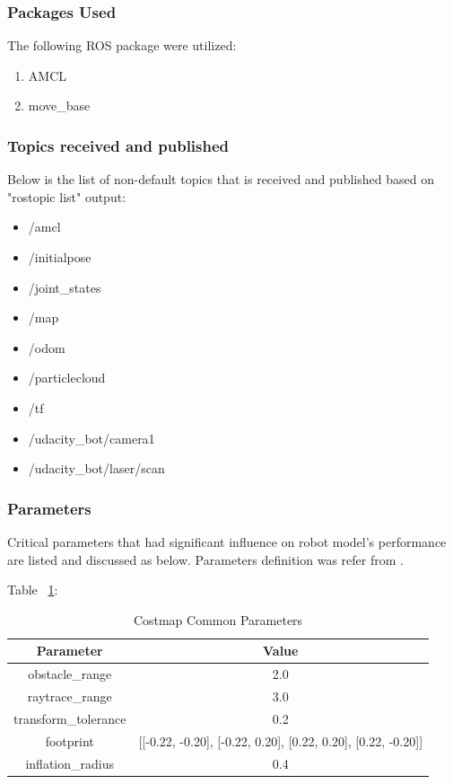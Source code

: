 \documentclass[10pt,journal,compsoc]{IEEEtran}
\begin{document}
\subsubsection{Packages Used}
The following ROS package were utilized:
\begin{enumerate}
\item AMCL
\item move\_base

\end {enumerate}

\subsubsection{Topics received and published}
Below is the list of non-default topics that is received and published based on "rostopic list" output:
\begin{itemize}
\item /amcl
\item /initialpose
\item /joint\_states
\item /map
\item /odom
\item /particlecloud
\item /tf
\item /udacity\_bot/camera1
\item /udacity\_bot/laser/scan

\end {itemize}

\subsubsection{Parameters}
Critical parameters that had significant influence on robot model's performance are listed and discussed as below.  Parameters definition was refer from \cite{costmap_2d}.

Table ~\ref{Costmap Common Parameters}:
\begin{table}[h]
\setlength{\tabcolsep}{1pt}  %
\caption{Costmap Common Parameters}
\label{Costmap Common Parameters}
\begin{center}
\begin{tabular}{|c||c|}
\hline
Parameter & Value\\
\hline
obstacle\_range & 2.0\\
\hline
raytrace\_range & 3.0\\
\hline
transform\_tolerance & 0.2\\
\hline
footprint & [[-0.22, -0.20], [-0.22, 0.20], [0.22, 0.20], [0.22, -0.20]] \\
\hline
inflation\_radius & 0.4\\
\hline
\end{tabular}
\end{center}
\end{table}
\end{document}
